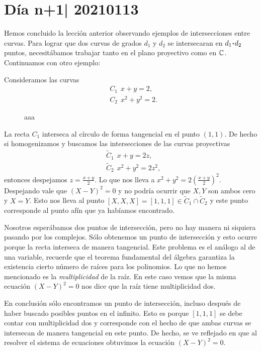 \documentclass[12pt]{memoir}
\begin{document}
\section{Día n+1| 20210113}

Hemos concluido la lección anterior observando ejemplos de intersecciones entre curvas. Para lograr que dos curvas de grados $d_1$ y $d_2$ se intersecaran en $d_1\.d_2$ puntos, necesitábamos trabajar tanto en el plano proyectivo como en $\mathbb{C}$. Continuamos con otro ejemplo:

\begin{Ex}
  Consideramos las curvas
  \begin{align*}
     & C_1\:\ x+y=2,\\
     & C_2\:\ x^2+y^2=2.
  \end{align*}
  \begin{figure}[h]
    \centering
    \caption{aaa}\label{aaaa}
  \end{figure}
  La recta $C_1$ interseca al círculo de forma tangencial en el punto $(1,1)$. De hecho si homogenizamos y buscamos las intersecciones de las curvas proyectivas
  \begin{align*}
     & \tilde C_1\:\ x+y=2z,\\
     & \tilde C_2\:\ x^2+y^2=2z^2,
  \end{align*}
  entonces despejamos $z=\frac{x+y}{2}$. Lo que nos lleva a $x^2+y^2=2\left(\frac{x+y}{2}\right)^2$. Despejando vale que $(X-Y)^2=0$ y no podría ocurrir que $X,Y$ son ambos cero y $X=Y$. Esto nos lleva al punto $[X,X,X]=[1,1,1]\in\tilde C_1\cap\tilde C_2$ y este punto corresponde al punto afín que ya habíamos encontrado.\par
  Nosotros esperábamos dos puntos de intersección, pero no hay manera ni siquiera pasando por los complejos. Sólo obtenemos un punto de intersección y esto ocurre porque la recta interseca de manera tangencial. Este problema es el análogo al de una variable, recuerde que el teorema fundamental del álgebra garantiza la existencia cierto número de raíces para los polinomios. Lo que no hemos mencionado es la \emph{multiplicidad} de la raíz. En este caso vemos que la misma ecuación $(X-Y)^2=0$ nos dice que la raíz tiene multiplicidad dos.\par
  En conclusión sólo encontramos un punto de intersección, incluso después de haber buscado posibles puntos en el infinito. Esto es porque $[1,1,1]$ se debe contar con multiplicidad dos y corresponde con el hecho de que ambas curvas se intersecan de manera tangencial en este punto. De hecho, se ve reflejado en que al resolver el sistema de ecuaciones obtuvimos la ecuación $(X-Y)^2=0$.
\end{Ex}
\end{document}
